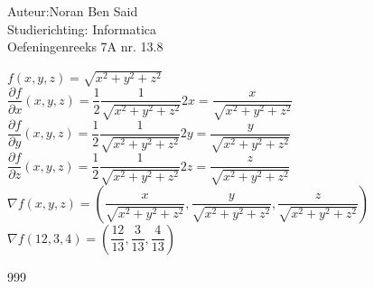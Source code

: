 \documentclass[a4paper]{article}
\begin{document}
  
\noindent \large Auteur:Noran Ben Said \\
\noindent \large Studierichting: Informatica\\
\noindent \large Oefeningenreeks 7A nr. 13.8\\

\medskip

\normalsize

$f(x, y, z) = \sqrt{x^2 + y^2 + z^2}$\\

$\dfrac{\partial f}{\partial x}\left(x,y,z\right)= \dfrac{1}{2} \dfrac{1}{\sqrt{x^2 + y^2 + z^2}} 2x = \dfrac{x}{\sqrt{x^2 + y^2 + z^2}}$\\

$\dfrac{\partial f}{\partial y}\left(x,y,z\right) = \dfrac{1}{2} \dfrac{1}{\sqrt{x^2 + y^2 + z^2}} 2y = \dfrac{y}{\sqrt{x^2 + y^2 + z^2}}$\\

$\dfrac{\partial f}{\partial z}\left(x,y,z\right) = \dfrac{1}{2} \dfrac{1}{\sqrt{x^2 + y^2 + z^2}} 2z = \dfrac{z}{\sqrt{x^2 + y^2 + z^2}}$\\

$\nabla f (x, y, z) = \left(\dfrac{x}{\sqrt{x^2 + y^2 + z^2}}, \dfrac{y}{\sqrt{x^2 + y^2 + z^2}}, \dfrac{z}{\sqrt{x^2 + y^2 + z^2}}\right)$\\

$\nabla f (12, 3, 4) = \left(\dfrac{12}{13}, \dfrac{3}{13}, \dfrac{4}{13}\right)$\\

\begin{thebibliography}{999}
\end{thebibliography}
\end{document}
